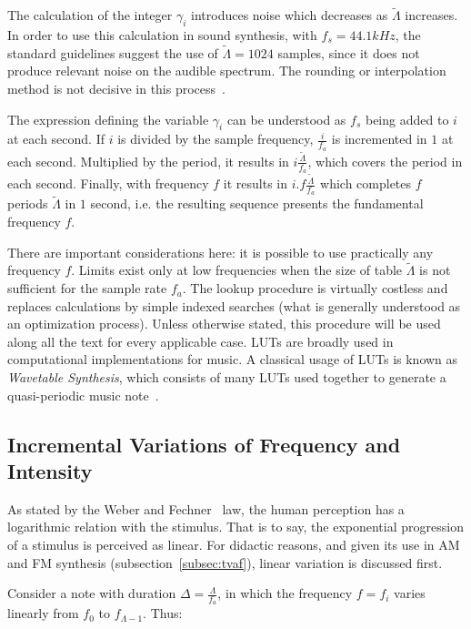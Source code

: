 The calculation of the integer $\gamma_i$ introduces noise which decreases as $\widetilde{\Lambda}$ increases.
In order to use this calculation in sound synthesis, with $f_s=44.1 kHz$, the standard guidelines suggest the use of $\widetilde{\Lambda} = 1024$ samples, since it does not produce relevant noise on the audible spectrum. The rounding or interpolation method is not decisive in this process~\cite{Geiger}.

The expression defining the variable $\gamma_i$ can be understood as $f_s$ being added to $i$ at each second.
If $i$ is divided by the sample frequency, $\frac{i}{f_a}$
is incremented in $1$ at each second. Multiplied by the period, it results in $i \frac{\widetilde{\Lambda}}{f_a}$, which covers the period in each second. Finally, with frequency $f$ it results in $i . f \frac{\widetilde{\Lambda}}{f_a}$ which completes $f$ periods $\widetilde{\Lambda}$ in $1$ second, i.e. the resulting sequence presents the fundamental frequency $f$.

There are important considerations here: it is possible to use practically any frequency $f$. Limits exist only at low frequencies when the size of table $\widetilde{\Lambda}$ is not sufficient for the sample rate $f_a$. The lookup procedure is virtually costless and replaces calculations by simple indexed searches (what is generally understood as an optimization process). Unless otherwise stated, this procedure will be used along all the text for every applicable case.
LUTs are broadly used in computational implementations for music. A classical usage of LUTs is known as \emph{Wavetable Synthesis}, which consists of many LUTs used together to generate a quasi-periodic music note~\cite{Cook,Wavetable}.

\subsection{Incremental Variations of Frequency and Intensity}\label{subsec:vars}

As stated by the Weber and Fechner~\cite{Weber-Fechner} law, the human perception has a logarithmic relation with the stimulus. That is to say, the exponential progression of a stimulus is perceived as linear.
For didactic reasons, and given its use in AM and FM synthesis (subsection~\ref{subsec:tvaf}), linear variation is discussed first.

Consider a note with duration $\Delta = \frac{\Lambda}{f_a}$, in which the frequency $f=f_i$ varies linearly from $f_0$ to $f_{\Lambda -1}$. Thus:

